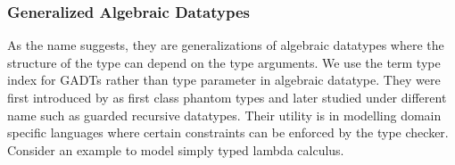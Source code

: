 \documentclass[manuscript,screen,nonacm]{acmart}
\begin{document}
\subsubsection{Generalized Algebraic Datatypes}
As the name suggests, they are generalizations of algebraic datatypes where the structure of the type can depend on the type arguments. We use the term type index for GADTs rather than type parameter in algebraic datatype. They were first introduced by \citep{cheney_first-class_2003} as first class phantom types and later studied under different name such as guarded recursive datatypes\cite{xi_guarded_2003}. Their utility is in modelling domain specific languages where certain constraints can be enforced by the type checker. Consider an example to model simply typed lambda calculus.




\end{document}
